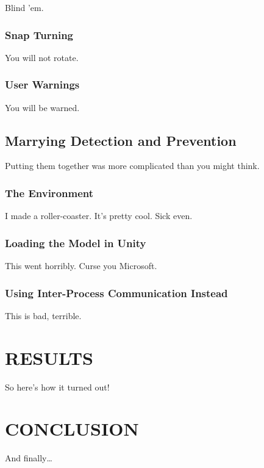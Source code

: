 Blind 'em.

\subsection{Snap Turning}
\label{subsec:snap_turn}

You will not rotate.

\subsection{User Warnings}
\label{subsec:user_warnings}

You will be warned.

\section{Marrying Detection and Prevention}
\label{sec:marrying}

Putting them together was more complicated than you might think.

\subsection{The Environment}
\label{subsec:environment}

I made a roller-coaster.
It's pretty cool.
Sick even.

\subsection{Loading the Model in Unity}
\label{subsec:loading}

This went horribly.
Curse you Microsoft.

\subsection{Using Inter-Process Communication Instead}
\label{subsec:ipc}

This is bad, terrible.


\chapter{RESULTS}
\label{ch:results}

So here's how it turned out!

\chapter{CONCLUSION}
\label{ch:conclusion}

And finally\ldots



